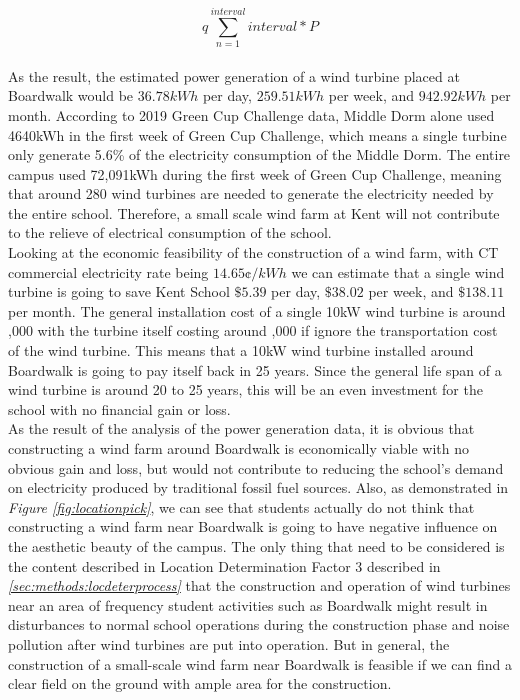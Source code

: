 \documentclass[review]{elsarticle}
\begin{document}
\begin{equation}q
    \label{equ:windenergy}
    \sum_{n=1}^{interval} interval*P
\end{equation}
\\\indent As the result, the estimated power generation of a wind turbine placed at Boardwalk would be $36.78kWh$ per day, $259.51kWh$ per week, and $942.92kWh$ per month. According to 2019 Green Cup Challenge data, Middle Dorm 
alone used 4640kWh in the first week of Green Cup Challenge, which means a single turbine only generate 5.6\% of the electricity consumption of the Middle Dorm. The entire campus used 72,091kWh during the first week of 
Green Cup Challenge, meaning that around 280 wind turbines are needed to generate the electricity needed by the entire school. Therefore, a small scale wind farm at Kent will not contribute to the relieve of electrical 
consumption of the school. 
\\\indent Looking at the economic feasibility of the construction of a wind farm, with CT commercial electricity rate being $14.65\cent/kWh$ we can estimate that a single wind turbine is going to save Kent School $\mathdollar5.39$ 
per day, $\mathdollar38.02$ per week, and $\mathdollar138.11$ per month. The general installation cost of a single 10kW wind turbine is around ,000 with the turbine itself 
costing around ,000 if ignore the transportation cost of the wind turbine. This means that a 10kW wind turbine installed around Boardwalk is going to pay itself back in 25 years. Since the general life span of a wind turbine is around 20 to 25 years, 
this will be an even investment for the school with no financial gain or loss.
\\\indent As the result of the analysis of the power generation data, it is obvious that constructing a wind farm around Boardwalk is economically viable with no obvious gain and loss, but would not contribute to reducing the school's 
demand on electricity produced by traditional fossil fuel sources. Also, as demonstrated in \textit{Figure \ref{fig:locationpick}}, we can see that students actually do not think that constructing a wind farm near Boardwalk is going to 
have negative influence on the aesthetic beauty of the campus. The only thing that need to be considered is the content described in Location Determination Factor 3 described in \textit{\ref{sec:methods:locdeterprocess}} that the construction 
and operation of wind turbines near an area of frequency student activities such as Boardwalk might result in disturbances to normal school operations during the construction phase and noise pollution after wind turbines are put into 
operation. But in general, the construction of a small-scale wind farm near Boardwalk is feasible if we can find a clear field on the ground with ample area for the construction.
\end{document}
